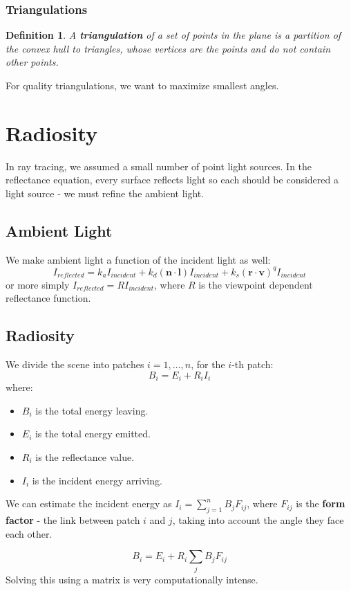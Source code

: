\documentclass[11pt]{article}
\newtheorem{defn}{Definition}
\begin{document}
\subsubsection{Triangulations}
\begin{defn}
  A \textbf{triangulation} of a set of points in the plane is a partition of the convex hull to triangles, whose vertices are the points and do not contain other points.
\end{defn}

For quality triangulations, we want to maximize smallest angles.

\section{Radiosity}
In ray tracing, we assumed a small number of point light sources.
In the reflectance equation, every surface reflects light so each should be considered a light source - we must refine the ambient light.

\subsection{Ambient Light}
We make ambient light a function of the incident light as well:
\[
  I_{reflected} = k_a I_{incident} + k_d(\bm{n} \cdot \bm{l}) I_{incident} + k_s(\bm{r} \cdot \bm{v})^q I_{incident} 
\]
or more simply $I_{reflected} = R I_{incident}$, where $R$ is the viewpoint dependent reflectance function.

\subsection{Radiosity}
We divide the scene into patches $i = 1, \dots, n$, for the $i$-th patch:
\[
  B_i = E_i + R_i I_i 
\]
where:
\begin{itemize}
  \item $B_i$ is the total energy leaving.
  \item $E_i$ is the total energy emitted.
  \item $R_i$ is the reflectance value.
  \item $I_i$ is the incident energy arriving.
\end{itemize}

We can estimate the incident energy as $I_i = \sum_{j = 1}^n B_j F_{ij}$, where $F_{ij}$ is the \textbf{form factor} - the link between patch $i$ and $j$, taking into account the angle they face each other.

\[
  B_i = E_i + R_i \sum_j B_j F_{ij} 
\]
Solving this using a matrix is very computationally intense.
\end{document}
